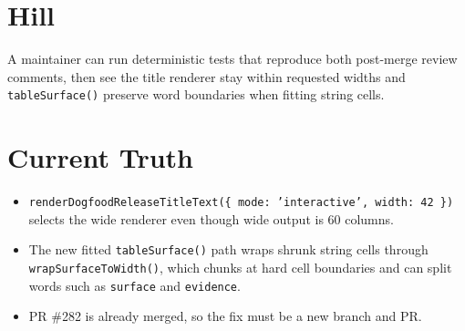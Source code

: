 \section{Hill}\label{record-136-hill}

A maintainer can run deterministic tests that reproduce both post-merge review comments, then see the title renderer stay within requested widths and \texttt{t\allowbreak{}a\allowbreak{}b\allowbreak{}l\allowbreak{}e\allowbreak{}S\allowbreak{}u\allowbreak{}r\allowbreak{}f\allowbreak{}a\allowbreak{}c\allowbreak{}e\allowbreak{}(\allowbreak{})} preserve word boundaries when fitting string cells.

\section{Current Truth}\label{record-136-current-truth}

\begin{itemize}
\tightlist
\item
  \texttt{r\allowbreak{}e\allowbreak{}n\allowbreak{}d\allowbreak{}e\allowbreak{}r\allowbreak{}D\allowbreak{}o\allowbreak{}g\allowbreak{}f\allowbreak{}o\allowbreak{}o\allowbreak{}d\allowbreak{}R\allowbreak{}e\allowbreak{}l\allowbreak{}e\allowbreak{}a\allowbreak{}s\allowbreak{}e\allowbreak{}T\allowbreak{}i\allowbreak{}t\allowbreak{}l\allowbreak{}e\allowbreak{}T\allowbreak{}e\allowbreak{}x\allowbreak{}t\allowbreak{}(\allowbreak{}\{\allowbreak{} \allowbreak{}m\allowbreak{}o\allowbreak{}d\allowbreak{}e\allowbreak{}:\allowbreak{} \allowbreak{}'\allowbreak{}i\allowbreak{}n\allowbreak{}t\allowbreak{}e\allowbreak{}r\allowbreak{}a\allowbreak{}c\allowbreak{}t\allowbreak{}i\allowbreak{}v\allowbreak{}e\allowbreak{}'\allowbreak{},\allowbreak{} \allowbreak{}w\allowbreak{}i\allowbreak{}d\allowbreak{}t\allowbreak{}h\allowbreak{}:\allowbreak{} \allowbreak{}4\allowbreak{}2\allowbreak{} \allowbreak{}\}\allowbreak{})} selects the wide renderer even though wide output is 60 columns.
\item
  The new fitted \texttt{t\allowbreak{}a\allowbreak{}b\allowbreak{}l\allowbreak{}e\allowbreak{}S\allowbreak{}u\allowbreak{}r\allowbreak{}f\allowbreak{}a\allowbreak{}c\allowbreak{}e\allowbreak{}(\allowbreak{})} path wraps shrunk string cells through \texttt{w\allowbreak{}r\allowbreak{}a\allowbreak{}p\allowbreak{}S\allowbreak{}u\allowbreak{}r\allowbreak{}f\allowbreak{}a\allowbreak{}c\allowbreak{}e\allowbreak{}T\allowbreak{}o\allowbreak{}W\allowbreak{}i\allowbreak{}d\allowbreak{}t\allowbreak{}h\allowbreak{}(\allowbreak{})}, which chunks at hard cell boundaries and can split words such as \texttt{s\allowbreak{}u\allowbreak{}r\allowbreak{}f\allowbreak{}a\allowbreak{}c\allowbreak{}e} and \texttt{e\allowbreak{}v\allowbreak{}i\allowbreak{}d\allowbreak{}e\allowbreak{}n\allowbreak{}c\allowbreak{}e}.
\item
  PR \#282 is already merged, so the fix must be a new branch and PR.
\end{itemize}

